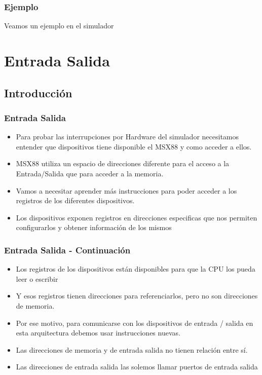 \documentclass{beamer}
\begin{document}
\begin{frame}
\frametitle{Ejemplo}
\begin{block}{}
Veamos un ejemplo en el simulador
\end{block}
\end{frame}

\section{Entrada Salida}


\subsection{Introducción}
\begin{frame}
\frametitle{Entrada Salida}
\begin{itemize}
 \item Para probar las interrupciones por Hardware del simulador necesitamos entender que dispositivos tiene disponible el MSX88 y como acceder a ellos. 
 \item MSX88 utiliza un espacio de direcciones diferente para el acceso a la Entrada/Salida que para acceder a la memoria.
 \item Vamos a necesitar aprender más instrucciones para poder acceder a los registros de los diferentes dispositivos.
 \item Los dispositivos exponen registros en direcciones especificas que nos permiten configurarlos y obtener información de los mismos
\end{itemize}
\end{frame}

\begin{frame}
\frametitle{Entrada Salida - Continuación}
\begin{itemize}
 \item Los registros de los dispositivos están disponibles para que la CPU los pueda leer o escribir 
 \item Y esos registros tienen direcciones para referenciarlos, pero no son direcciones de memoria.
 \item Por ese motivo, para comunicarse con los dispositivos de entrada / salida en esta arquitectura debemos  usar instrucciones nuevas.
 \item Las direcciones de memoria y de entrada salida no tienen relación entre sí.
 \item Las direcciones de entrada salida las solemos llamar puertos de entrada salida

\end{itemize}
\end{frame}
\end{document}
